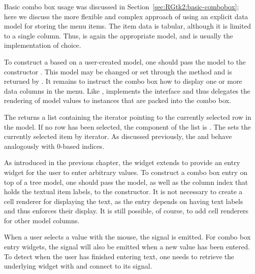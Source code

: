 Basic combo box usage was discussed in
Section~\ref{sec:RGtk2:basic-combobox}; here we discuss the more
flexible and complex approach of using an explicit data model for
storing the menu items. The item data is tabular, although it is
limited to a single column. Thus,  is again the
appropriate model, and  is usually the
implementation of choice.

To construct a  based on a user-created model, one
should pass the model to the constructor
. This model may be changed or set through
the  method and is returned by
. It remains to instruct the combo box
how to display one or more data columns in the menu. Like
,  implements the
 interface and thus delegates the rendering of
model values to  instances that are packed into
the combo box.

The  returns a list containing the iterator
pointing to the currently selected row in the model.  If no row has been
selected, the  component of the list is .
The  sets the currently selected
item by iterator. As discussed previously, the
 and 
behave analogously with $0$-based indices.

As introduced in the previous chapter, the 
widget extends  to provide an entry widget for the
user to enter arbitrary values. To construct a combo box entry on top
of a tree model, one should pass the model, as well as the column
index that holds the textual item labels, to the
 constructor. It is not necessary to
create a cell renderer for displaying the text, as the entry depends
on having text labels and thus enforces their display. It is still
possible, of course, to add cell renderers for other model columns.

When a user selects a value with the mouse, the  signal
is emitted. For combo box entry widgets, the  signal
will also be emitted when a new value has been entered. To detect when
the user has finished entering text, one needs to retrieve the
underlying  widget with  and
connect to its  signal.

